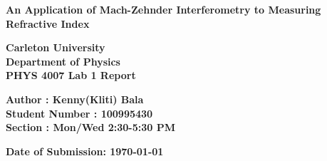 \documentclass{article}
\begin{document}
\begin{titlepage}
    \begin{center}
        \vspace*{1cm}
 
        \Large
        \textbf{An Application of Mach-Zehnder Interferometry to Measuring Refractive Index}\\
        
                \vspace{1cm}           

         \textbf{Carleton University}\\
        \vspace{1cm}
        \textbf{Department of Physics}\\
        \vspace{1cm}        
        \textbf{PHYS 4007 Lab 1 Report}\\
        
        \vspace{3cm}           
 
        \large
        \textbf{Author : Kenny(Kliti) Bala }\\
        \vspace{1cm}
        \textbf{Student Number : 100995430 }\\
        \vspace{1cm}
        \textbf{Section : Mon/Wed 2:30-5:30 PM}\\
        
        \vspace{3cm}

        \textbf{Date of Submission: \today}\\
        
        \vspace{3cm}
        
        \Large
        

        
        \vfill
    \end{center}
\end{titlepage}

\clearpage
\tableofcontents

\lstlistoflistings


\clearpage
\end{document}
